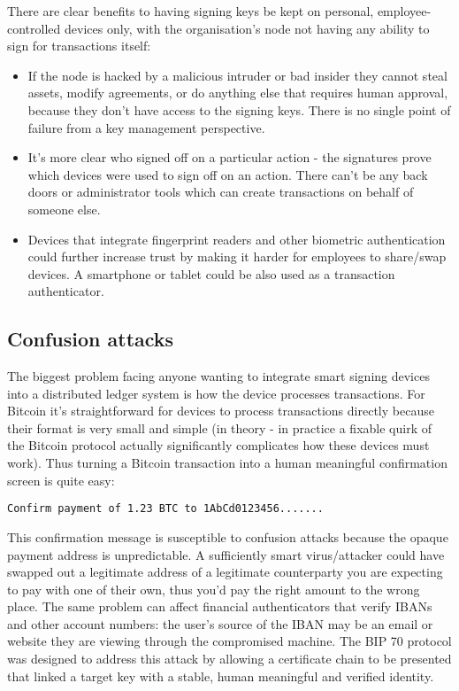 \documentclass{article}
\begin{document}
There are clear benefits to having signing keys be kept on personal, employee-controlled devices only, with the organisation's
node not having any ability to sign for transactions itself:

\begin{itemize}
\item If the node is hacked by a malicious intruder or bad insider they cannot steal assets, modify agreements,
or do anything else that requires human approval, because they don't have access to the signing keys. There is no single
point of failure from a key management perspective.
\item It's more clear who signed off on a particular action - the signatures prove which devices were used to sign off
on an action. There can't be any back doors or administrator tools which can create transactions on behalf of someone else.
\item Devices that integrate fingerprint readers and other biometric authentication could further increase trust by
making it harder for employees to share/swap devices. A smartphone or tablet could be also used as a transaction authenticator.
\end{itemize}

\subsection{Confusion attacks}

The biggest problem facing anyone wanting to integrate smart signing devices into a distributed ledger system is how the
device processes transactions. For Bitcoin it's straightforward for devices to process transactions directly because
their format is very small and simple (in theory - in practice a fixable quirk of the Bitcoin protocol actually
significantly complicates how these devices must work). Thus turning a Bitcoin transaction into a human meaningful
confirmation screen is quite easy:

\indent\texttt{Confirm payment of 1.23 BTC to 1AbCd0123456.......}

This confirmation message is susceptible to confusion attacks because the opaque payment address is unpredictable. A
sufficiently smart virus/attacker could have swapped out a legitimate address of a legitimate counterparty you are
expecting to pay with one of their own, thus you'd pay the right amount to the wrong place. The same problem can affect
financial authenticators that verify IBANs and other account numbers: the user's source of the IBAN may be an email or
website they are viewing through the compromised machine. The BIP 70\cite{BIP70} protocol was designed to address this
attack by allowing a certificate chain to be presented that linked a target key with a stable, human meaningful and
verified identity.
\end{document}
